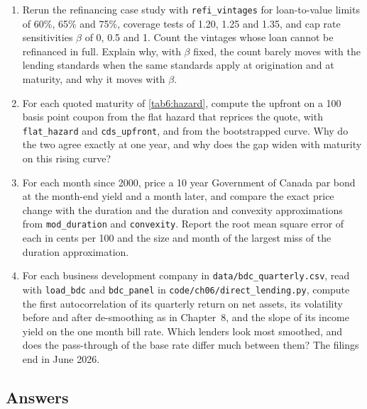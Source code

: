 \begin{chapterrefs}
\begin{enumerate}[label=\textbf{P6.\arabic*}, leftmargin=*, ref=P6.\arabic*]
\item Rerun the refinancing case study with \texttt{refi\_vintages} for loan-to-value limits of 60\%, 65\% and
75\%, coverage tests of 1.20, 1.25 and 1.35, and cap rate sensitivities $\beta$ of 0, 0.5 and 1. Count the
vintages whose loan cannot be refinanced in full. Explain why, with $\beta$ fixed, the count barely moves
with the lending standards when the same standards apply at origination and at maturity, and why it moves
with $\beta$.
\item For each quoted maturity of \cref{tab6:hazard}, compute the upfront on a 100 basis point coupon from the
flat hazard that reprices the quote, with \texttt{flat\_hazard} and \texttt{cds\_upfront}, and from the
bootstrapped curve. Why do the two agree exactly at one year, and why does the gap widen with maturity on
this rising curve?
\item For each month since 2000, price a 10 year Government of Canada par bond at the month-end yield and a
month later, and compare the exact price change with the duration and the duration and convexity
approximations from \texttt{mod\_duration} and \texttt{convexity}. Report the root mean square error of each
in cents per 100 and the size and month of the largest miss of the duration approximation.
\item For each business development company in \texttt{data/bdc\_quarterly.csv}, read with
\texttt{load\_bdc} and \texttt{bdc\_panel} in \texttt{code/ch06/direct\_lending.py}, compute the first
autocorrelation of its quarterly return on net assets, its volatility before and after de-smoothing as
in Chapter~8, and the slope of its income yield on the one month bill rate. Which lenders look
most smoothed, and does the pass-through of the base rate differ much between them? The filings end in
June 2026.
\end{enumerate}

\subsection*{Answers}


\end{chapterrefs}
